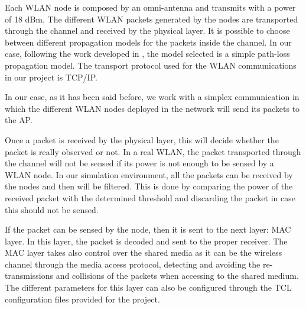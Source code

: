 Each \acs{WLAN} node is composed by an omni-antenna and transmits with a power of 18 dBm. The different \acs{WLAN} packets generated by the nodes are transported through the channel and received by the physical layer. It is possible to choose between different propagation models for the packets inside the channel. In our case, following the work developed in \cite{marcello-thesis}, the model selected is a simple path-loss propagation model. The transport protocol used for the \acs{WLAN} communications in our project is TCP/IP.

In our case, as it has been said before, we work with a simplex communication in which the different \acs{WLAN} nodes deployed in the network will send its packets to the \acs{AP}.

Once a packet is received by the physical layer, this will decide whether the packet is really observed or not. In a real \acs{WLAN}, the packet transported through the channel will not be sensed if its power is not enough to be sensed by a \acs{WLAN} node. In our simulation environment, all the packets can be received by the nodes and then will be filtered. This is done by comparing the power of the received packet with the determined threshold and discarding the packet in case this should not be sensed.

If the packet can be sensed by the node, then it is sent to the next layer: MAC layer. In this layer, the packet is decoded and sent to the proper receiver. The MAC layer takes also control over the shared media as it can be the wireless channel through the media access protocol, detecting and avoiding the re-transmissions and collisions of the packets when accessing to the shared medium. The different parameters for this layer can also be configured through the TCL configuration files provided for the project.